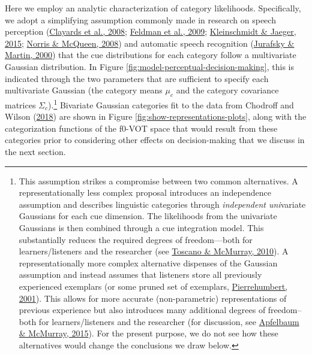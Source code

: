 \documentclass[
  11pt,
  man,floatsintext]{apa6}
\begin{document}
Here we employ an analytic characterization of category likelihoods. Specifically, we adopt a simplifying assumption commonly made in research on speech perception (\protect\hyperlink{ref-clayards2008}{Clayards et al., 2008}; \protect\hyperlink{ref-feldman2009}{Feldman et al., 2009}; \protect\hyperlink{ref-kleinschmidt-jaeger2015}{Kleinschmidt \& Jaeger, 2015}; \protect\hyperlink{ref-norris-mcqueen2008}{Norris \& McQueen, 2008}) and automatic speech recognition (\protect\hyperlink{ref-jurafsky-martin2000}{Jurafsky \& Martin, 2000}) that the cue distributions for each category follow a multivariate Gaussian distribution. In Figure \ref{fig:model-perceptual-decision-making}, this is indicated through the two parameters that are sufficient to specify each multivariate Gaussian (the category means \(\mu_c\) and the category covariance matrices \(\Sigma_c\)).\footnote{This assumption strikes a compromise between two common alternatives. A representationally less complex proposal introduces an independence assumption and describes linguistic categories through \emph{independent uni}variate Gaussians for each cue dimension. The likelihoods from the univariate Gaussians is then combined through a cue integration model. This substantially reduces the required degrees of freedom---both for learners/listeners and the researcher (see \protect\hyperlink{ref-toscano-mcmurray2010}{Toscano \& McMurray, 2010}). A representationally more complex alternative dispenses of the Gaussian assumption and instead assumes that listeners store all previously experienced exemplars (or some pruned set of exemplars, \protect\hyperlink{ref-pierrehumbert2001}{Pierrehumbert, 2001}). This allows for more accurate (non-parametric) representations of previous experience but also introduces many additional degrees of freedom--both for learners/listeners and the researcher (for discussion, see \protect\hyperlink{ref-apfelbaum-mcmurray2015}{Apfelbaum \& McMurray, 2015}). For the present purpose, we do not see how these alternatives would change the conclusions we draw below.} Bivariate Gaussian categories fit to the data from Chodroff and Wilson (\protect\hyperlink{ref-chodroff-wilson2018}{2018}) are shown in Figure \ref{fig:show-representations-plots}, along with the categorization functions of the f0-VOT space that would result from these categories prior to considering other effects on decision-making that we discuss in the next section.
\end{document}
